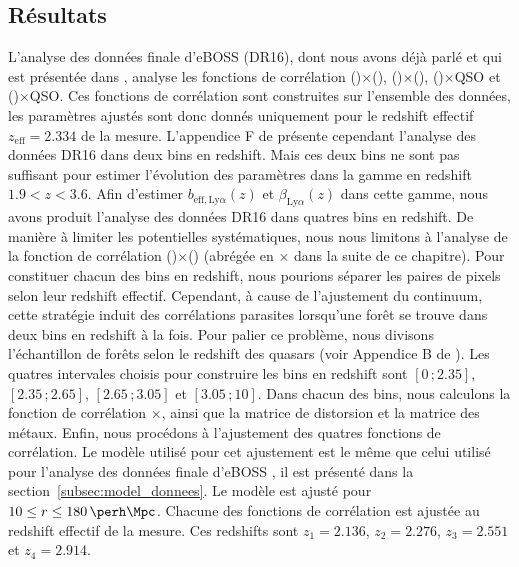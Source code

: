 \documentclass[11pt, twoside, a4paper, openright]{report}
\begin{document}
\subsection{Résultats}
L'analyse des données finale d'eBOSS (DR16), dont nous avons déjà parlé et qui est présentée dans \textcite{prov}, analyse les fonctions de corrélation \lya(\lya{})$\times$\lya{}(\lya{}), \lya{}(\lya{})$\times$\lya{}(\lyb{}), \lya{}(\lya{})$\times$QSO et \lya{}(\lyb{})$\times$QSO. Ces fonctions de corrélation sont construites sur l'ensemble des données, les paramètres ajustés sont donc donnés uniquement pour le redshift effectif $z_{\mathrm{eff}} = \num{2.334}$ de la mesure. L'appendice F de \textcite{prov} présente cependant l'analyse des données DR16 dans deux bins en redshift. Mais ces deux bins ne sont pas suffisant pour estimer l'évolution des paramètres \lya{} dans la gamme en redshift $\num{1.9} < z  < \num{3.6}$.
Afin d'estimer $b_{\mathrm{eff},\mathrm{Ly}\alpha}(z)$ et $\beta_{\mathrm{Ly}\alpha}(z)$ dans cette gamme, nous avons produit l'analyse des données DR16 dans quatres bins en redshift. De manière à limiter les potentielles systématiques, nous nous limitons à l'analyse de la fonction de corrélation \lya{}(\lya{})$\times$\lya{}(\lya{}) (abrégée en \lya{}$\times$\lya{} dans la suite de ce chapitre).
Pour constituer chacun des bins en redshift, nous pourions séparer les paires de pixels selon leur redshift effectif. Cependant, à cause de l'ajustement du continuum, cette stratégie induit des corrélations parasites lorsqu'une forêt se trouve dans deux bins en redshift à la fois. Pour palier ce problème, nous divisons l'échantillon de forêts selon le redshift des quasars (voir Appendice B de \textcite{Agathe2019a}).
Les quatres intervales choisis pour construire les bins en redshift sont $[\num{0}\,;\num{2.35}]$, $[\num{2.35}\,;\num{2.65}]$, $[\num{2.65}\,;\num{3.05}]$ et $[\num{3.05}\,;\num{10}]$.
Dans chacun des bins, nous calculons la fonction de corrélation \lya{}$\times$\lya{}, ainsi que la matrice de distorsion et la matrice des métaux.
Enfin, nous procédons à l'ajustement des quatres fonctions de corrélation. Le modèle utilisé pour cet ajustement est le même que celui utilisé pour l'analyse des données finale d'eBOSS \autocite{prov}, il est présenté dans la section~\ref{subsec:model_donnees}.
Le modèle est ajusté pour $\num{10} \leq r \leq \SI{180}{\perh\Mpc}$.
Chacune des fonctions de corrélation est ajustée au redshift effectif de la mesure. Ces redshifts sont $z_1 = \num{2.136}$, $z_2 = \num{2.276}$, $z_3 = \num{2.551}$ et $z_4 = \num{2.914}$.
\end{document}
